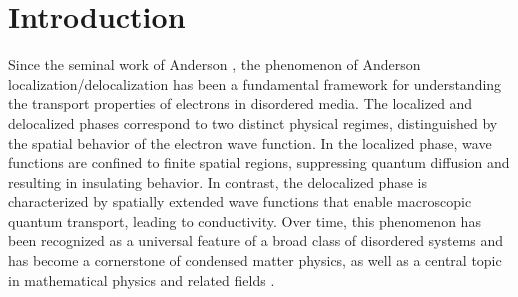 \documentclass[10pt,reqno]{amsart}
\numberwithin{equation}{section}
\numberwithin{figure}{section}
\theoremstyle{plain} %
\theoremstyle{definition} %
\numberwithin{equation}{section}
\begin{document}
\maketitle

{
\hypersetup{linkcolor=black}
\tableofcontents
}

\section{Introduction}

Since the seminal work of Anderson \cite{PhysRev.109.1492}, the phenomenon of Anderson localization/delocalization has been a fundamental framework for understanding the transport properties of electrons in disordered media. The localized and delocalized phases correspond to two distinct physical regimes, distinguished by the spatial behavior of the electron wave function. 
In the localized phase, wave functions are confined to finite spatial regions, suppressing quantum diffusion and resulting in insulating behavior. In contrast, the delocalized phase is characterized by spatially extended wave functions that enable macroscopic quantum transport, leading to conductivity. Over time, this phenomenon has been recognized as a universal feature of a broad class of disordered systems and has become a cornerstone of condensed matter physics, as well as a central topic in mathematical physics and related fields \cite{Lagendijk09Fifty,Abrahams201050years,Sheng2006Intro,lee1985disordered,thouless1974electrons,Anderson1978Local}.
\end{document}
